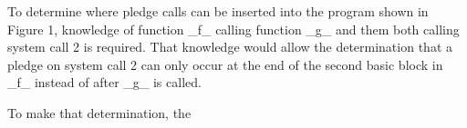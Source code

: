 To determine where pledge calls can be inserted into the program shown in Figure 1, knowledge of function _f_ calling function _g_ and them both calling system call 2 is required. That knowledge would allow the determination that a pledge on system call 2 can only occur at the end of the second basic block in _f_ instead of after _g_ is called.

To make that determination, the 